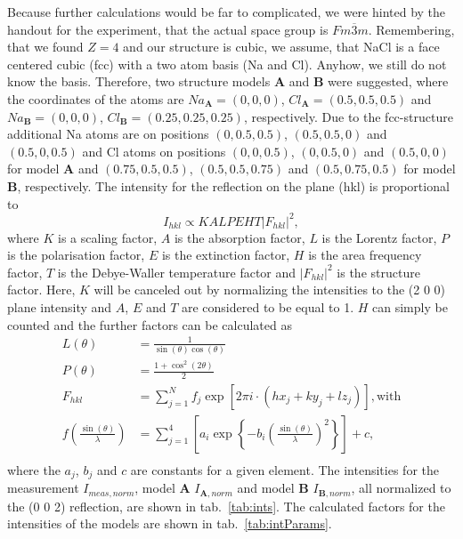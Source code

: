 Because further calculations would be far to complicated, we were hinted by the handout for the experiment, that the actual space group is $Fm\overline{3}m$. Remembering, that we found $Z=4$ and our structure is cubic, we assume, that NaCl is a face centered cubic (fcc) with a two atom basis (Na and Cl). Anyhow, we still do not know the basis. Therefore, two structure models $\mathbf{A}$ and $\mathbf{B}$ were suggested, where the coordinates of the atoms are $Na_{\mathbf{A}} = (0,0,0)$, $Cl_{\mathbf{A}} = (0.5,0.5,0.5)$ and $Na_{\mathbf{B}} = (0,0,0)$, $Cl_{\mathbf{B}} = (0.25,0.25,0.25)$, respectively. Due to the fcc-structure additional Na atoms are on positions $(0,0.5,0.5)$, $(0.5,0.5,0)$ and $(0.5,0,0.5)$ and Cl atoms on positions $(0,0,0.5)$, $(0,0.5,0)$ and $(0.5,0,0)$ for model \textbf{A} and $(0.75,0.5,0.5)$, $(0.5,0.5,0.75)$ and $(0.5,0.75,0.5)$ for model \textbf{B}, respectively. The intensity for the reflection on the plane (hkl) is proportional to 
\begin{equation}
    I_{hkl} \propto KALPEHT|F_{hkl}|^2,
\end{equation}
where $K$ is a scaling factor, $A$ is the absorption factor, $L$ is the Lorentz factor, $P$ is the polarisation factor, $E$ is the extinction factor, $H$ is the area frequency factor, $T$ is the Debye-Waller temperature factor and $|F_{hkl}|^2$ is the structure factor. Here, $K$ will be canceled out by normalizing the intensities to the (2 0 0) plane intensity and $A$, $E$ and $T$ are considered to be equal to 1. $H$ can simply be counted and the further factors can be calculated as 
\begin{align}
    L(\theta) &= \frac{1}{\sin(\theta)\cos(\theta)} \\
    P(\theta) &= \frac{1+\cos^2(2\theta)}{2} \\
    F_{hkl} &= \sum_{j=1}^{N} f_j \exp[2\pi i\cdot (hx_j+ky_j+lz_j)]\mathrm{, with} \\
    f\left(\frac{\sin(\theta)}{\lambda}\right) &= \sum_{j=1}^{4} \left[a_i\exp\left\{-b_i\left(\frac{\sin(\theta)}{\lambda}\right)^2\right\}\right] + c, \\
\end{align}
where the $a_j$, $b_j$ and $c$ are constants for a given element. The intensities for the measurement $I_{meas,norm}$, model \textbf{A} $I_{\mathbf{A},norm}$ and model \textbf{B} $I_{\mathbf{B},norm}$, all normalized to the (0 0 2) reflection, are shown in tab.~\ref{tab:ints}. The calculated factors for the intensities of the models are shown in tab.~\ref{tab:intParams}. 

